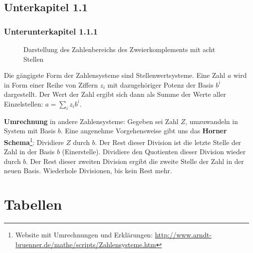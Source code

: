 \documentclass[12pt, a4paper, twopage]{scrartcl}
\begin{document}
\subsection{Unterkapitel 1.1}

\subsubsection{Unterunterkapitel 1.1.1}

%

\begin{figure}
	\caption{Darstellung des Zahlenbereichs des Zweierkomplements mit acht Stellen\label{fig:tabelle_zweierkomplement}}
\end{figure}
%
Die gängigste Form der Zahlensysteme sind Stellenwertsysteme. Eine Zahl $a$ wird in Form einer Reihe von Ziffern $z_i$ mit dazugehöriger Potenz der Basis $b^i$ dargestellt. Der Wert der Zahl ergibt sich dann als Summe der Werte aller Einzelstellen: $a = \sum\limits_{i}z_ib^i$.

\textbf{Umrechnung} in andere Zahlensysteme: Gegeben sei Zahl $Z$, umzuwandeln in System mit Basis $b$.
Eine angenehme Vorgehensweise gibt uns das \textbf{Horner Schema}\footnote{
Website mit Umrechnungen und Erklärungen: \url{http://www.arndt-bruenner.de/mathe/scripts/Zahlensysteme.htm}
}: Dividiere $Z$ durch $b$. Der Rest dieser Division ist die letzte Stelle der Zahl in der Basis $b$  (Einerstelle). Dividiere den Quotienten dieser Division wieder durch $b$. Der Rest dieser zweiten Division ergibt die zweite Stelle der Zahl in der neuen Basis. Wiederhole Divisionen, bis kein Rest mehr.


\section{Tabellen}
\end{document}
